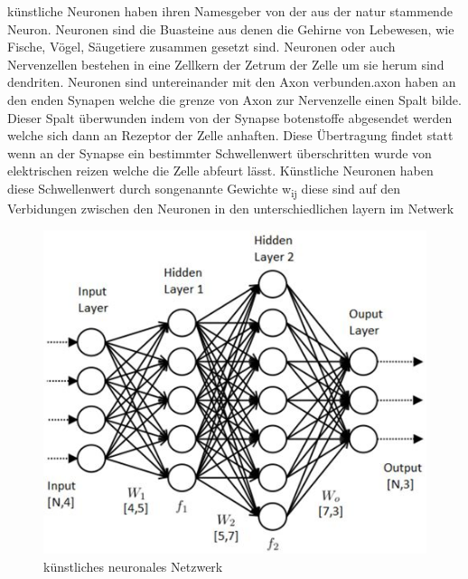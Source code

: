 \documentclass{llncs}
\begin{document}
künstliche Neuronen haben ihren Namesgeber von der aus der natur stammende Neuron. Neuronen sind die Buasteine aus denen die Gehirne von Lebewesen, wie Fische, Vögel, Säugetiere zusammen gesetzt sind. Neuronen oder auch Nervenzellen bestehen in eine Zellkern der Zetrum der Zelle um sie herum sind dendriten. Neuronen sind untereinander mit den Axon verbunden.axon haben an den enden Synapen welche die grenze von Axon zur Nervenzelle einen Spalt bilde. Dieser Spalt überwunden indem von der Synapse botenstoffe abgesendet werden welche sich dann an Rezeptor der Zelle anhaften. Diese Übertragung findet statt wenn an der Synapse ein bestimmter Schwellenwert überschritten wurde von elektrischen reizen welche die Zelle abfeurt lässt. Künstliche Neuronen haben diese Schwellenwert durch songenannte Gewichte w\textsubscript{ij} diese sind auf den Verbidungen zwischen den Neuronen in den unterschiedlichen layern im Netwerk
\begin{figure}[htbp] 
	\centering
	\includegraphics[width=1.0\textwidth]{neuronalesnetzwerk.jpg}
	\caption{künstliches neuronales Netzwerk}
	\label{fig:Bild1}
\end{figure}
\\
\end{document}
